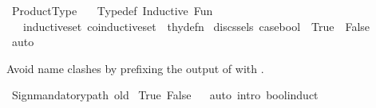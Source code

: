 %
\begin{isabellebody}%
%
%
\isadelimdocument
%
\endisadelimdocument
%
\isatagdocument
%
\isamarkuptrue%
%
\endisatagdocument
{\isafolddocument}%
%
\isadelimdocument
%
\endisadelimdocument
%
\isadelimtheory
%
\endisadelimtheory
%
\isatagtheory
{}\isamarkupfalse%
\ Product{\isacharunderscore}{\kern0pt}Type\isanewline
\ \ \ Typedef\ Inductive\ Fun\isanewline
\ \ \ {\isachardoublequoteopen}inductive{\isacharunderscore}{\kern0pt}set{\isachardoublequoteclose}\ {\isachardoublequoteopen}coinductive{\isacharunderscore}{\kern0pt}set{\isachardoublequoteclose}\ {\isacharcolon}{\kern0pt}{\isacharcolon}{\kern0pt}\ thy{\isacharunderscore}{\kern0pt}defn\isanewline
{}%
\endisatagtheory
{\isafoldtheory}%
%
\isadelimtheory
%
\endisadelimtheory
%
\isadelimdocument
%
\endisadelimdocument
%
\isatagdocument
%
\isamarkuptrue%
%
\endisatagdocument
{\isafolddocument}%
%
\isadelimdocument
%
\endisadelimdocument
{}\isamarkupfalse%
\ {\isacharparenleft}{\kern0pt}discs{\isacharunderscore}{\kern0pt}sels{\isacharparenright}{\kern0pt}\ case{\isacharunderscore}{\kern0pt}bool\ \ True\ {\isacharbar}{\kern0pt}\ False\isanewline
%
\isadelimproof
\ \ %
\endisadelimproof
%
\isatagproof
{}\isamarkupfalse%
\ auto%
\endisatagproof
{\isafoldproof}%
%
\isadelimproof
%
\endisadelimproof
%
\begin{isamarkuptext}%
Avoid name clashes by prefixing the output of  with .%
\end{isamarkuptext}\isamarkuptrue%
%
\isadelimML
%
\endisadelimML
%
\isatagML
{}\isamarkupfalse%
\ {\isacartoucheopen}Sign{\isachardot}{\kern0pt}mandatory{\isacharunderscore}{\kern0pt}path\ {\isachardoublequote}{\kern0pt}old{\isachardoublequote}{\kern0pt}{\isacartoucheclose}%
\endisatagML
{\isafoldML}%
%
\isadelimML
%
\endisadelimML
\isanewline
\isanewline
{}\isamarkupfalse%
\ True\ False%
\isadelimproof
\ %
\endisadelimproof
%
\isatagproof
{}\isamarkupfalse%
\ {\isacharparenleft}{\kern0pt}auto\ intro{\isacharcolon}{\kern0pt}\ bool{\isacharunderscore}{\kern0pt}induct{\isacharparenright}{\kern0pt}%
\endisatagproof
{\isafoldproof}%

\end{isabellebody}
